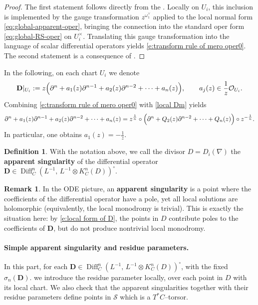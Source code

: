 \documentclass[twoside, 11pt]{article}
\numberwithin{equation}{section}
\theoremstyle{theorem}
\numberwithin{theorem}{section}
\theoremstyle{definition}
\newtheorem{definition}[definition]{Definition}
\newtheorem{remark}[remark]{Remark}
\begin{document}
\begin{proof}
The first statement follows directly from the .
Locally on $U_i$, this inclusion is implemented by the gauge transformation
$z^{\omega_1^\vee}$ applied to the local normal form \eqref{eq:global-apparent-oper}, bringing the connection into the standard oper form \eqref{eq:global-RS-oper} on $U_i^\times$.
Translating this gauge transformation into the language of scalar differential operators yields \eqref{e:transform rule of mero oper0}. The second statement is a consequence of .
\end{proof}
In the following, on each chart $U_i$ we denote
\begin{equation}\label{e:local form of D}
\mathbf D|_{U_i}
:= z\Bigl(\partial^n + a_1(z)\partial^{n-1}
+ a_2(z)\partial^{n-2} + \cdots + a_n(z)\Bigr),
\qquad a_j(z)\in \frac{1}{z}\mathcal O_{U_i}.
\end{equation}
Combining \eqref{e:transform rule of mero oper0} with \eqref{local Dm} yields
\begin{equation}\label{e:transform rule of mero oper}
\partial^n + a_1(z)\partial^{n-1}
+ a_2(z)\partial^{n-2} + \cdots + a_n(z)
=
z^{\frac{1}{n}}\circ
\Bigl(\partial^n + Q_2(z)\partial^{n-2} + \cdots + Q_n(z)\Bigr)
\circ z^{-\frac{1}{n}}.
\end{equation}
In particular, one obtains
\(
a_1(z)=-\frac{1}{z}.
\)

\begin{definition}
With the notation above, we call the divisor $D=D_i(\nabla)$ the \textbf{apparent singularity}
of the differential operator $\mathbf D \in \operatorname{Diff}_C^{n} (L^{-1},\,L^{-1}\otimes K_C^{n}(D))^\circ$.
\end{definition}

\begin{remark}
In the ODE picture, an \textbf{apparent singularity} is a point where the coefficients of the differential operator have a pole, yet all local solutions are holomorphic (equivalently, the local monodromy is trivial).
This is exactly the situation here: by \eqref{e:local form of D}, the points in $D$ contribute poles to the coefficients of $\mathbf D$, but do not produce nontrivial local monodromy.
\end{remark}

\paragraph{Simple apparent singularity and residue parameters.}
In this part, for each $\mathbf D \in \operatorname{Diff}_C^{n} (L^{-1},\,L^{-1}\otimes K_C^{n}(D))^\circ$, with the fixed $\sigma_n(\mathbf{D})$. we introduce the residue parameter locally, over each point in $D$ with its local chart. We also check that the apparent singularities together with their residue parameters define points in $\mathcal{S}$ which is a $T^*C$--torsor. 
\end{document}

